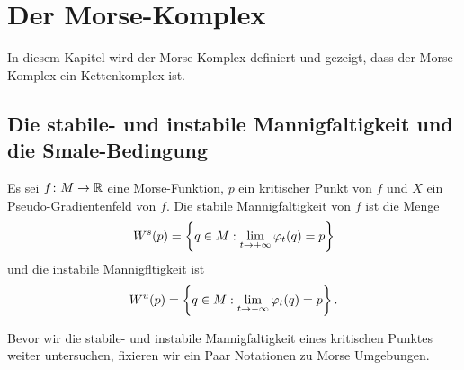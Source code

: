\chapter{Der Morse-Komplex}
In diesem Kapitel wird der Morse Komplex definiert und gezeigt, dass der 
Morse-Komplex ein Kettenkomplex ist.

\section{Die stabile- und instabile Mannigfaltigkeit und die Smale-Bedingung}

\begin{definition}
    \label{def: stabile und instabile mannigfaltigkeit}
    Es sei $f \colon M \to { \mathbb R }$ eine Morse-Funktion, $p$ ein kritischer Punkt von $f$ und $X$ ein
    Pseudo-Gradientenfeld von $f$. Die stabile Mannigfaltigkeit von $f$ ist die Menge
    \[ { W^s } (p) = \left\{ q \in M : \lim_{t \to + \infty} \varphi_t(q) = p \right\} \]
    und die instabile Mannigfltigkeit ist
    \[ { W^u } (p) = \left\{ q \in M : \lim_{t \to - \infty} \varphi_t(q) = p \right\} . \]
\end{definition}

Bevor wir die stabile- und instabile Mannigfaltigkeit eines kritischen Punktes weiter untersuchen, 
fixieren wir ein Paar Notationen zu Morse Umgebungen.

